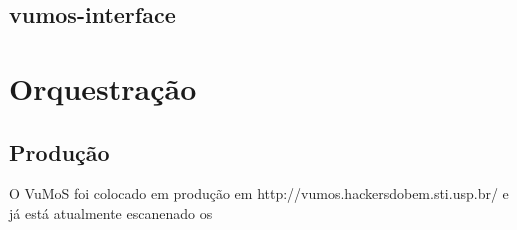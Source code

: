     \subsection{vumos-interface}
    

\section{Orquestração}
    
    \subsection{Produção}
    O VuMoS foi colocado em produção em http://vumos.hackersdobem.sti.usp.br/ e já está atualmente escanenado os  






% 